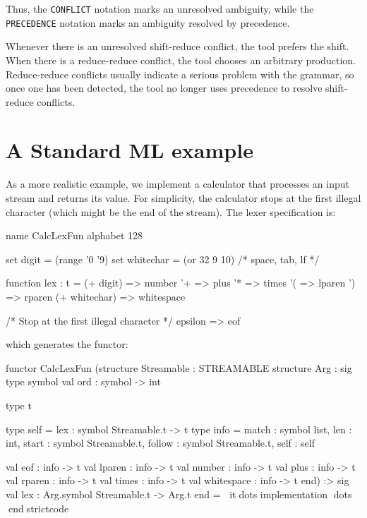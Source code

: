 \documentclass[10pt]{article}
\begin{document}
\begin{strictcode}
\begin{strictcode}
\begin{strictcode}
\begin{strictcode}
\begin{strictcode}
\begin{strictcode}
\begin{strictcode}
Thus, the {\tt CONFLICT} notation marks an unresolved ambiguity, while
the {\tt PRECEDENCE} notation marks an ambiguity resolved by
precedence.

Whenever there is an unresolved shift-reduce conflict, the tool
prefers the shift.  When there is a reduce-reduce conflict, the tool
chooses an arbitrary production.  Reduce-reduce conflicts usually
indicate a serious problem with the grammar, so once one has been
detected, the tool no longer uses precedence to resolve shift-reduce
conflicts.


\section{A Standard ML example}
\label{sec:example-sml}

As a more realistic example, we implement a calculator that processes
an input stream and returns its value.  For simplicity, the calculator
stops at the first illegal character (which might be the end of the
stream).  The lexer specification is:

\begin{code}
name CalcLexFun
alphabet 128

set digit = (range '0 '9)
set whitechar = (or 32 9 10)  /* space, tab, lf */

function lex : t =
  (+ digit) => number
  '+ => plus
  '* => times
  '( => lparen
  ') => rparen
  (+ whitechar) => whitespace

  /* Stop at the first illegal character */
  epsilon => eof
\end{code}

\noindent
which generates the functor:

\begin{strictcode}
functor CalcLexFun
   (structure Streamable : STREAMABLE
    structure Arg :
       sig
          type symbol
          val ord : symbol -> int

          type t

          type self = { lex : symbol Streamable.t -> t }
          type info = { match : symbol list,
                        len : int,
                        start : symbol Streamable.t,
                        follow : symbol Streamable.t,
                        self : self }

          val eof : info -> t
          val lparen : info -> t
          val number : info -> t
          val plus : info -> t
          val rparen : info -> t
          val times : info -> t
          val whitespace : info -> t
       end)
   :>
   sig
      val lex : Arg.symbol Streamable.t -> Arg.t
   end
= itdots implementation dots
endstrictcode


\end{strictcode}
\end{strictcode}
\end{strictcode}
\end{strictcode}
\end{strictcode}
\end{strictcode}
\end{strictcode}
\end{strictcode}
\end{document}
